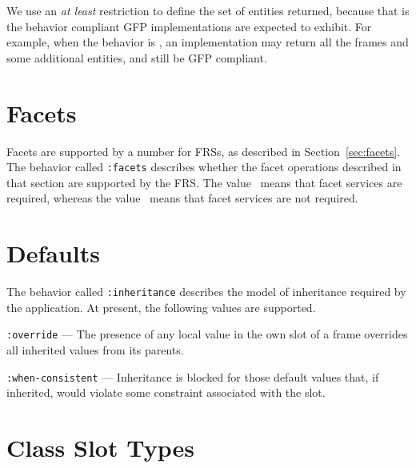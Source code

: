 We use an {\em at least} restriction to define the set of entities
returned, because that is the behavior compliant GFP implementations
are expected to exhibit.  For example, when the behavior is
,  an implementation may return all the frames and
some additional entities, and still be GFP compliant.

\section{Facets}

Facets are supported by a number for FRSs, as described in
Section~\ref{sec:facets}.  The behavior called {\tt :facets} describes
whether the facet operations described in that section are supported
by the FRS.  The value \true\ means that facet services are required,
whereas the value \false\ means that facet services are not required.



\section{Defaults}

The behavior called {\tt :inheritance} describes the model of
inheritance required by the application.  At present, the following
values are supported.

\bitem
\item {\tt :override} --- The presence of any local value in the
own slot of a frame overrides all inherited values from its parents.

\item {\tt :when-consistent} --- Inheritance is blocked for those default
values that, if inherited, would violate some constraint associated
with the slot.
\eitem

\section{Class Slot Types}


